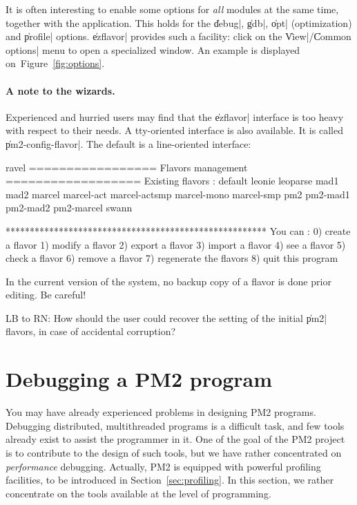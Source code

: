 It is often interesting to enable some options for \emph{all} modules
at the same time, together with the application. This holds for the
\|debug|, \|gdb|, \|opt| (optimization) and \|profile| options.
\|ezflavor| provides such a facility: click on the \|View|/\|Common
options| menu to open a specialized window. An example is displayed
on~Figure~\ref{fig:options}.



\paragraph{A note to the wizards.}

Experienced and hurried users may find that the \|ezflavor| interface is
too heavy with respect to their needs. A tty-oriented  interface is
also available. It is called \|pm2-config-flavor|. The default is a 
line-oriented interface:
\begin{shell}
ravel%
================= Flavors management ==================
Existing flavors :
default leonie leoparse mad1 mad2 
marcel marcel-act marcel-actsmp marcel-mono marcel-smp 
pm2 pm2-mad1 pm2-mad2 pm2-marcel swann 

******************************************************
You can :
 0) create a flavor
 1) modify a flavor
 2) export a flavor
 3) import a flavor
 4) see    a flavor
 5) check  a flavor
 6) remove a flavor
 7) regenerate the flavors
 8) quit this program
\end{shell}

\begin{warning}
  In the current version of the system, no backup copy of a flavor is
  done prior editing. Be careful! 
\end{warning}

\begin{note}
  LB to RN: How should the user could recover the setting of the
  initial \|pm2| flavors, in case of accidental corruption?
\end{note}


\section{Debugging a PM2 program}

You may have already experienced problems in designing PM2 programs.
Debugging distributed, multithreaded programs is a difficult task, and
few tools already exist to assist the programmer in it. One of the
goal of the PM2 project is to contribute to the design of such tools,
but we have rather concentrated on \emph{performance} debugging.
Actually, PM2 is equipped with powerful profiling facilities, to be
introduced in Section~\ref{sec:profiling}. In this section, we rather
concentrate on the tools available at the level of programming.


